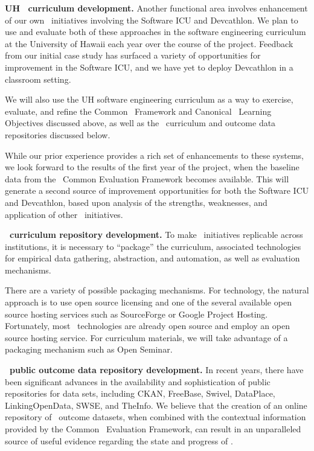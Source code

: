 {\bf UH \eCT\ curriculum development.}  Another functional area involves
enhancement of our own \eCT\ initiatives involving the Software ICU and
Devcathlon. We plan to use and evaluate both of these approaches in the
software engineering curriculum at the University of Hawaii each year over
the course of the project.  Feedback from our initial case study
\citep{csdl2-09-02,csdl2-09-03} has surfaced a variety of opportunities for
improvement in the Software ICU, and we have yet to deploy Devcathlon in a
classroom setting.

We will also use the UH software engineering curriculum as a way to
exercise, evaluate, and refine the Common \eCT\ Framework and Canonical
\eCT\ Learning Objectives discussed above, as well as the \eCT\ curriculum
and outcome data repositories discussed below.

While our prior experience provides a rich set of enhancements to these
systems, we look forward to the results of the first year of the project,
when the baseline data from the \eCT\ Common Evaluation Framework becomes
available.  This will generate a second source of improvement opportunities
for both the Software ICU and Devcathlon, based upon analysis of the
strengths, weaknesses, and application of other \eCT\ initiatives. 

{\bf \eCT\ curriculum repository development.}  To make \eCT\ initiatives
replicable across institutions, it is necessary to ``package'' the
curriculum, associated technologies for empirical data gathering,
abstraction, and automation, as well as evaluation mechanisms.  

There are a variety of possible packaging mechanisms.  For technology, the 
natural approach is to use open source licensing and one of the several
available open source hosting services such as SourceForge or Google Project
Hosting.  Fortunately, most \eCT\ technologies are already open source and
employ an open source hosting service.  For curriculum materials, we will 
take advantage of a packaging mechanism such as Open Seminar. 

{\bf \eCT\ public outcome data repository development.}  In recent years,
there have been significant advances in the availability and sophistication
of public repositories for data sets, including CKAN, FreeBase, Swivel,
DataPlace, LinkingOpenData, SWSE, and TheInfo.  We believe that the
creation of an online repository of \eCT\ outcome datasets, when combined
with the contextual information provided by the Common \eCT\ Evaluation
Framework, can result in an unparalleled source of useful evidence
regarding the state and progress of \eCT.  

